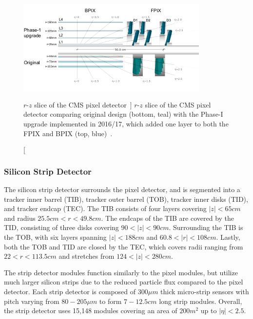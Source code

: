 \begin{figure}[htbp]
	\centering
	\includegraphics[width=0.85\textwidth]{figs/03_experiment/20120828_01_pixel_phase1_largesharp.png}
	\caption
	[$r$-$z$ slice of the CMS pixel detector~\cite{CMSPixelP1}]
	{$r$-$z$ slice of the CMS pixel detector comparing original design (bottom, teal) with the Phase-I upgrade implemented in 2016/17, which added one layer to both the FPIX and BPIX (top, blue)~\cite{CMSPixelP1}.}
	\label{fig:pixel}
\end{figure}

\subsubsection{Silicon Strip Detector} \label{sec:CMS_strip}
The silicon strip detector surrounds the pixel detector, and is segmented into a tracker inner barrel (TIB), tracker outer barrel (TOB), tracker inner disks (TID), and tracker endcap (TEC). The TIB consists of four layers covering $\left|z\right|<65\unit{cm}$ and radius $25.5\unit{cm}<r<49.8\unit{cm}$. The endcaps of the TIB are covered by the TID, consisting of three disks covering $90<\left|z\right|<90\unit{cm}$. Surrounding the TIB is the TOB, with six layers spanning $\left|z\right|<188\unit{cm}$ and $60.8<\left|r\right|<108\unit{cm}$. Lastly, both the TOB and TID are closed by the TEC, which covers radii ranging from $22<r<113.5\unit{cm}$ and stretches from $124<\left|z\right|<280\unit{cm}$.

The strip detector modules function similarly to the pixel modules, but utilize much larger silicon strips due to the reduced particle flux compared to the pixel detector. Each strip detector is composed of $300\unit{\mu m}$ thick micro-strip sensors with pitch varying from $80-205\unit{\mu m}$ to form $7-12.5\unit{cm}$ long strip modules. Overall, the strip detector uses 15,148 modules covering an area of $200\unit{m^2}$ up to $\left|\eta\right|<2.5$.

